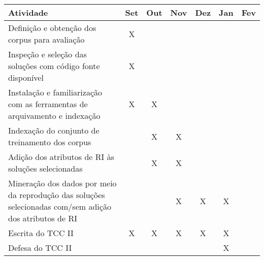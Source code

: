 


\begin{center}
    \begin{adjustbox}{max width={\textwidth},keepaspectratio}%
    \begin{tabular}{@{} p{6.5cm}|c|c|c|c|c|c @{}}
        \toprule
        \textbf{Atividade}
        & Set & Out & Nov & Dez & Jan & Fev
        \\ \hline
        Definição e obtenção dos corpus para avaliação 
        & X   &     &     &     &     &          
        \\ \hline
        Inspeção e seleção das soluções com código fonte disponível
        & X   &     &     &     &     &          
        \\ \hline
        Instalação e familiarização com as ferramentas de arquivamento e indexação
        & X   & X   &     &     &     &          
        \\ \hline
        Indexação do conjunto de treinamento dos corpus
        &     & X   & X   &     &     &          
        \\ \hline
        Adição dos atributos de RI às soluções selecionadas
        &     & X   & X   &     &     &    
        \\ \hline
        Mineração dos dados por meio da reprodução das soluções selecionadas com/sem adição dos atributos de RI
        &     &     & X   & X   & X   &  
        \\ \hline
        Escrita do TCC II                       
        & X   & X   & X   & X   & X   &         
        \\ \hline
        Defesa do TCC II                        
        &     &     &     &     & X   &        
        \\
        \bottomrule
    \end{tabular}
    \end{adjustbox}
\end{center}
